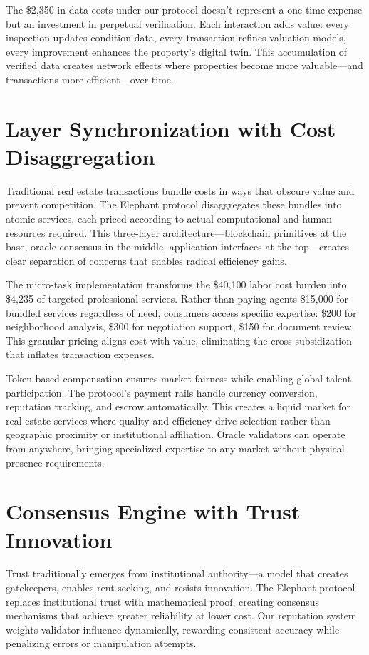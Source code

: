 The \$2{,}350 in data costs under our protocol doesn't represent a one-time expense but an investment in perpetual verification. Each interaction adds value: every inspection updates condition data, every transaction refines valuation models, every improvement enhances the property's digital twin. This accumulation of verified data creates network effects where properties become more valuable—and transactions more efficient—over time.

\section{Layer Synchronization with Cost Disaggregation}

Traditional real estate transactions bundle costs in ways that obscure value and prevent competition. The Elephant protocol disaggregates these bundles into atomic services, each priced according to actual computational and human resources required. This three-layer architecture—blockchain primitives at the base, oracle consensus in the middle, application interfaces at the top—creates clear separation of concerns that enables radical efficiency gains.

The micro-task implementation transforms the \$40{,}100 labor cost burden into \$4{,}235 of targeted professional services. Rather than paying agents \$15{,}000 for bundled services regardless of need, consumers access specific expertise: \$200 for neighborhood analysis, \$300 for negotiation support, \$150 for document review. This granular pricing aligns cost with value, eliminating the cross-subsidization that inflates transaction expenses.

Token-based compensation ensures market fairness while enabling global talent participation. The protocol's payment rails handle currency conversion, reputation tracking, and escrow automatically. This creates a liquid market for real estate services where quality and efficiency drive selection rather than geographic proximity or institutional affiliation. Oracle validators can operate from anywhere, bringing specialized expertise to any market without physical presence requirements.

\section{Consensus Engine with Trust Innovation}

Trust traditionally emerges from institutional authority—a model that creates gatekeepers, enables rent-seeking, and resists innovation. The Elephant protocol replaces institutional trust with mathematical proof, creating consensus mechanisms that achieve greater reliability at lower cost. Our reputation system weights validator influence dynamically, rewarding consistent accuracy while penalizing errors or manipulation attempts.

